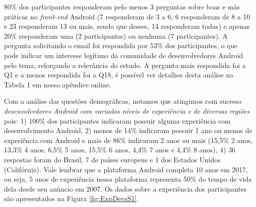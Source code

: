 

80\% dos participantes responderam pelo menos 3 perguntas sobre boas e más práticas no \textit{front-end} Android (7 responderam de 3 a 6, 6 responderam de 8 a 10 e 23 responderam 13 ou mais, sendo que desses, 14 responderam todas) e apenas 20\% responderam uma (2 participantes) ou nenhuma (7 participantes). A pergunta solicitando o email foi respondida por 53\% dos participantes, o que pode indicar um interesse legítimo da comunidade de desenvolvedores Android pelo tema, reforçando a relevância do estudo. A pergunta mais respondida foi a Q1 e a menos respondida foi a Q18, é possível ver detalhes desta análise na Tabela 1 em nosso apêndice online.


Com a análise das questões demográficas, notamos que atingimos com sucesso \textit{desenvolvedores Android com variados níveis de experiência e de diversas regiões} pois: 1) 100\% dos participantes indicaram possuir alguma experiência com desenvolvimento Android, 2) menos de 14\% indicaram possuir 1 ano ou menos de experiência com Android e mais de 86\% indicaram 2 anos ou mais (15,5\% 2 anos, 13,3\% 4 anos, 6,5\% 5 anos, 15,5\% 6 anos, 4,4\% 7 anos e 4,4\% 8 anos), 4) 36 respostas foram do Brasil, 7 de países europeus e 1 dos Estados Unidos (Califórnia). Vale lembrar que a plataforma Android completa 10 anos em 2017, ou seja, 5 anos de experiência nessa plataforma representa 50\% do tempo de vida dela desde seu anúncio em 2007. Os dados sobre a experiência dos participantes são apresentados na Figura \ref{fig:ExpDevsS1}.


